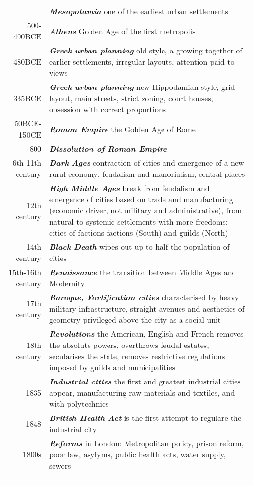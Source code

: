 \documentclass{article}
\newcommand{\foo}{\hspace{-2.3pt}$\bullet$ \hspace{5pt} }
\newcommand{\bisection}[1]{\textbf{\textit{#1}}}
\begin{document}
\begin{tabular}{r |@{\foo} p{}}
 & \bisection{Mesopotamia} one of the earliest urban settlements \\
500-400BCE & \bisection{Athens} Golden Age of the first metropolis \\
480BCE  & \bisection{Greek urban planning} old-style, a growing together of earlier settlements, irregular layouts, attention paid to views \\
335BCE  & \bisection{Greek urban planning} new Hippodamian style, grid layout, main streets, strict zoning, court houses, obsession with correct proportions \\
50BCE-150CE & \bisection{Roman Empire} the Golden Age of Rome \\
800 & \bisection{Dissolution of Roman Empire} \\
6th-11th century & \bisection{Dark Ages} contraction of cities and emergence of a new rural economy: feudalism and manorialism, central-places \\
12th century & \bisection{High Middle Ages} break from feudalism and emergence of cities based on trade and manufacturing (economic driver, not military and administrative), from natural to systemic settlements with more freedoms; cities of factions factions (South) and guilds (North) \\
14th century & \bisection{Black Death} wipes out up to half the population of cities \\
15th-16th century & \bisection{Renaissance} the transition between Middle Ages and Modernity \\
17th century & \bisection{Baroque, Fortification cities} characterised by heavy military infrastructure, straight avenues and aesthetics of geometry privileged above the city as a social unit \\
18th century & \bisection{Revolutions} the American, English and French removes the absolute powers, overthrows feudal estates, secularises the state, removes restrictive regulations imposed by guilds and municipalities \\
1835 & \bisection{Industrial cities} the first and greatest industrial cities appear, manufacturing raw materials and textiles, and with polytechnics \\
1848 & \bisection{British Health Act} is the first attempt to regulare the industrial city \\
1800s & \bisection{Reforms} in London: Metropolitan policy, prison reform, poor law, asylyms, public health acts, water supply, sewers  \\
 & \bisection{}  \\
  & \bisection{}  \\
   & \bisection{}  \\
\end{tabular}
\end{document}
